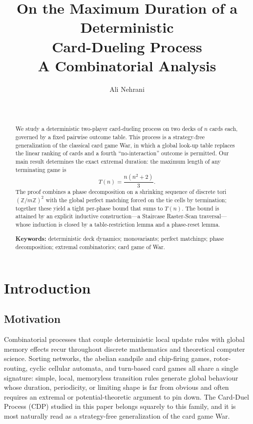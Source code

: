 \documentclass[12pt]{article}
\title{On the Maximum Duration of a Deterministic\\ Card-Dueling Process\\[4pt]
\large A Combinatorial Analysis}
\author{Ali Nehrani\\ \address{GROUND Inc., Tokyo, Japan\\
\url{https://en.groundinc.co.jp/} }\\ \email{nehrani@gmail.com}}
\begin{document}
\maketitle

\begin{abstract}
We study a deterministic two-player card-dueling process on two decks of $n$ cards each,
governed by a fixed pairwise outcome table. This process is a strategy-free generalization
of the classical card game War, in which a global look-up table replaces the linear ranking of
cards and a fourth ``no-interaction'' outcome is permitted. Our main result determines
the exact extremal duration: the maximum length of any terminating game is
\[
T(n) = \frac{n(n^2+2)}{3}.
\]
The proof combines a phase decomposition on a shrinking sequence of discrete tori $(\mathbb{Z}/m\mathbb{Z})^2$
with the global perfect matching forced on the tie cells by termination; together these
yield a tight per-phase bound that sums to $T(n)$. The bound is attained by an explicit
inductive construction---a Staircase Raster-Scan traversal---whose induction is closed by a
table-restriction lemma and a phase-reset lemma.

\medskip
\noindent\textbf{Keywords:} deterministic deck dynamics; monovariants; perfect matchings; phase decomposition; extremal combinatorics; card game of War.
\end{abstract}

\section{Introduction}

\subsection{Motivation}
Combinatorial processes that couple deterministic local update rules with global memory effects recur throughout discrete mathematics and theoretical computer science. Sorting networks,
the abelian sandpile and chip-firing games, rotor-routing, cyclic cellular automata, and turn-based
card games all share a single signature: simple, local, memoryless transition rules generate global
behaviour whose duration, periodicity, or limiting shape is far from obvious and often requires
an extremal or potential-theoretic argument to pin down. The Card-Duel Process (CDP)
studied in this paper belongs squarely to this family, and it is most naturally read as a strategy-free
generalization of the card game War. 
\end{document}
